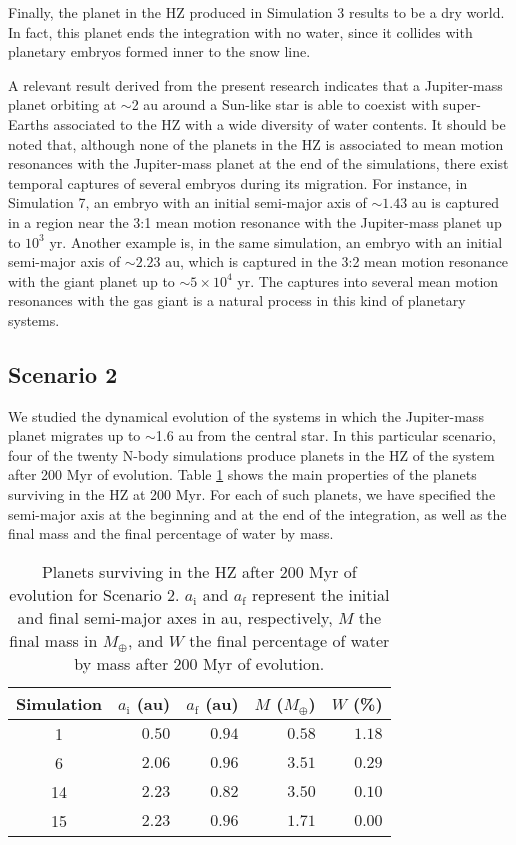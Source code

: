 \documentclass{aa}
\begin{document}
Finally, the planet in the HZ produced in Simulation 3 results to be a dry world. In fact, this planet ends the integration with
no water, since it collides with planetary embryos formed inner to the snow line.

A relevant result derived from the present research indicates that a Jupiter-mass planet orbiting at $\sim$2 au around a Sun-like star
is able to coexist with super-Earths associated to the HZ with a wide diversity of water contents. It should be noted that, although none of the planets in the HZ is associated to mean motion resonances with the Jupiter-mass planet
at the end of the simulations, there exist temporal captures of several embryos during its migration. For instance, in Simulation 7, an embryo with an initial
semi-major axis of $\sim 1.43$ au is captured in a region near the 3:1 mean motion resonance with the Jupiter-mass planet up to
$10^{3}$ yr. Another example is, in the same simulation, an embryo with an initial semi-major axis of $\sim 2.23$ au, which is
captured in the 3:2 mean motion resonance with the giant planet up to $\sim 5 \times 10^4$ yr. The captures into several mean motion
resonances with the gas giant is a natural process in this kind of planetary systems.

\subsection{Scenario 2}
\label{sect:scenario2}

We studied the dynamical evolution of the systems in which the Jupiter-mass planet migrates up to $\sim$1.6 au from the central
star. In this particular scenario, four of the twenty N-body simulations produce planets in the HZ of the system after 200 Myr
of evolution. Table \ref{table:resultados-Scen2} shows the main properties of the planets surviving in the HZ at 200 Myr.
For each of such planets, we have specified the semi-major axis at the beginning and at the end of the integration, as well as
the final mass and the final percentage of water by mass.

\begin{table}[ht]
\caption{
 Planets surviving in the HZ after 200 Myr of evolution for Scenario 2.
 $a_{\text{i}}$ and $a_{\text{f}}$ represent the initial and final semi-major axes in au, respectively, $M$ the final mass
 in $M_\oplus$, and $W$ the  final percentage of water by mass after 200 Myr of evolution.
 }
 \begin{center}
  \begin{tabular}{|c|r|r|r|r|}
 \hline
 Simulation & $a_{\text{i}}$ (au) & $a_{\text{f}}$ (au) & $M$ ($M_{\oplus}$) & $W$ (\%) \\
 \hline \hline
 1  & $0.50$ & $0.94$ & $0.58$ & $1.18$ \\
 6  & $2.06$ & $0.96$ & $3.51$ & $0.29$ \\
 14 & $2.23$ & $0.82$ & $3.50$ & $0.10$   \\
 15 & $2.23$ & $0.96$ & $1.71$ & $0.00$   \\
 \hline
  \end{tabular}
 \label{table:resultados-Scen2}
 \end{center}
\end{table}
\end{document}
